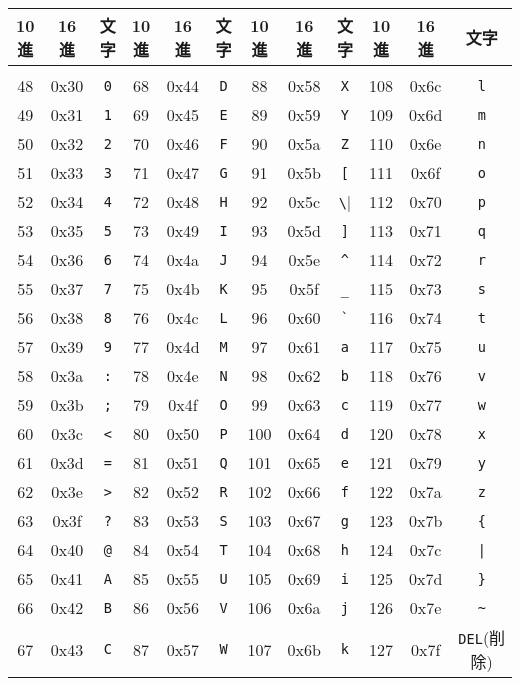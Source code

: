 \begin{center}
\begin{tabular}{|c|c|c||c|c|c||c|c|c||c|c|c|}\hline
10進&16進&文字&10進&16進&文字&10進&16進&文字&10進&16進&文字\\ \hline
& & & & & & & & & & & \\[-15pt] \hline
48&0x30&\verb|0|&68&0x44&\verb|D|&88&0x58&\verb|X|&108&0x6c&\verb|l|\\ \hline
49&0x31&\verb|1|&69&0x45&\verb|E|&89&0x59&\verb|Y|&109&0x6d&\verb|m|\\ \hline
50&0x32&\verb|2|&70&0x46&\verb|F|&90&0x5a&\verb|Z|&110&0x6e&\verb|n|\\ \hline
51&0x33&\verb|3|&71&0x47&\verb|G|&91&0x5b&\verb|[|&111&0x6f&\verb|o|\\ \hline
52&0x34&\verb|4|&72&0x48&\verb|H|&92&0x5c&\verb|\|&112&0x70&\verb|p|\\ \hline
53&0x35&\verb|5|&73&0x49&\verb|I|&93&0x5d&\verb|]|&113&0x71&\verb|q|\\ \hline
54&0x36&\verb|6|&74&0x4a&\verb|J|&94&0x5e&\verb|^|&114&0x72&\verb|r|\\ \hline
55&0x37&\verb|7|&75&0x4b&\verb|K|&95&0x5f&\verb|_|&115&0x73&\verb|s|\\ \hline
56&0x38&\verb|8|&76&0x4c&\verb|L|&96&0x60&\verb|`|&116&0x74&\verb|t|\\ \hline
57&0x39&\verb|9|&77&0x4d&\verb|M|&97&0x61&\verb|a|&117&0x75&\verb|u|\\ \hline
58&0x3a&\verb|:|&78&0x4e&\verb|N|&98&0x62&\verb|b|&118&0x76&\verb|v|\\ \hline
59&0x3b&\verb|;|&79&0x4f&\verb|O|&99&0x63&\verb|c|&119&0x77&\verb|w|\\ \hline
60&0x3c&\verb|<|&80&0x50&\verb|P|&100&0x64&\verb|d|&120&0x78&\verb|x|\\ \hline
61&0x3d&\verb|=|&81&0x51&\verb|Q|&101&0x65&\verb|e|&121&0x79&\verb|y|\\ \hline
62&0x3e&\verb|>|&82&0x52&\verb|R|&102&0x66&\verb|f|&122&0x7a&\verb|z|\\ \hline
63&0x3f&\verb|?|&83&0x53&\verb|S|&103&0x67&\verb|g|&123&0x7b&\verb|{|\\ \hline
64&0x40&\verb|@|&84&0x54&\verb|T|&104&0x68&\verb|h|&124&0x7c&\verb`|`\\ \hline
65&0x41&\verb|A|&85&0x55&\verb|U|&105&0x69&\verb|i|&125&0x7d&\verb|}|\\ \hline
66&0x42&\verb|B|&86&0x56&\verb|V|&106&0x6a&\verb|j|&126&0x7e&\verb|~|\\ \hline
67&0x43&\verb|C|&87&0x57&\verb|W|&107&0x6b&\verb|k|&127&0x7f&\verb|DEL|(削除)\\ \hline
\end{tabular}
\end{center}

